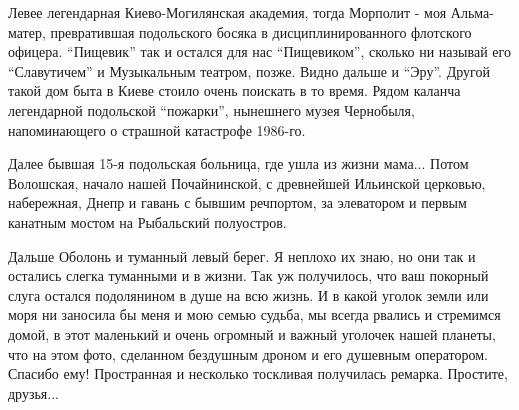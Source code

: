 Левее легендарная Киево-Могилянская академия, тогда Морполит - моя Альма-матер,
превратившая подольского босяка в дисциплинированного флотского офицера.
\enquote{Пищевик} так и остался для нас \enquote{Пищевиком}, сколько ни называй
его \enquote{Славутичем} и Музыкальным театром, позже. Видно дальше и
\enquote{Эру}. Другой такой дом быта в Киеве стоило очень поискать в то время.
Рядом каланча легендарной подольской \enquote{пожарки}, нынешнего музея
Чернобыля, напоминающего о страшной катастрофе 1986-го. 

Далее бывшая 15-я подольская больница, где ушла из жизни мама... Потом
Волошская, начало нашей Почайнинской, с древнейшей Ильинской церковью,
набережная, Днепр и гавань с бывшим речпортом, за элеватором и первым канатным
мостом на Рыбальский полуостров. 

Дальше Оболонь и туманный левый берег. Я неплохо их знаю, но они так и остались
слегка туманными и в жизни. Так уж получилось, что ваш покорный слуга остался
подолянином в душе на всю жизнь. И в какой уголок земли или моря ни заносила бы
меня и мою семью судьба, мы всегда рвались и стремимся домой, в этот маленький
и очень огромный и важный уголочек нашей планеты, что на этом фото, сделанном
бездушным дроном и его душевным оператором. Спасибо ему!  Пространная и
несколько тоскливая получилась ремарка. Простите, друзья...
